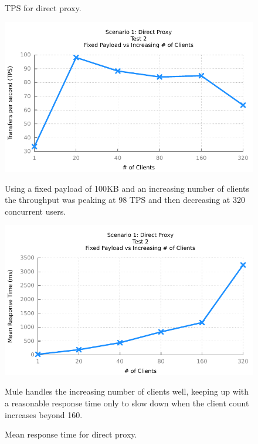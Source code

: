 \begin{figure}[H]
	\caption{TPS for direct proxy.}
	\centerline{\includegraphics{img/proxy_fp_iu_tps}}
	\label{fig:proxy-2-1}
	Using a fixed payload of 100KB and an increasing number of clients the throughput was peaking at 98 TPS and then decreasing at 320 concurrent users.

	\caption{Mean response time for direct proxy.}
	\centerline{\includegraphics{img/proxy_fp_iu_resp}}
	\label{fig:proxy-2-2}
	 Mule handles the increasing number of clients well, keeping up with a reasonable response time only to slow down when the client count increases beyond 160.
\end{figure}

